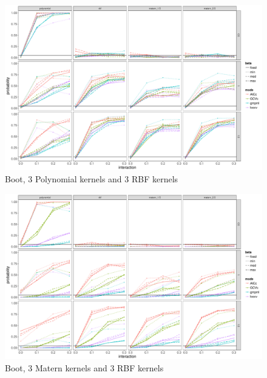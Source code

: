 \documentclass[article]{jss}
\begin{document}
\begin{appendix}
\begin{figure}
\begin{center}
\includegraphics[width=0.9\columnwidth]{exp_B4} 
\caption{Boot, 3 Polynomial kernels and 3 RBF kernels}
\label{fig:res}
\end{center}
\end{figure}

\begin{figure}
\begin{center}
\includegraphics[width=0.9\columnwidth]{exp_B5} 
\caption{Boot, 3 Matern kernels and 3 RBF kernels}
\label{fig:res}
\end{center}
\end{figure}


\end{appendix}

\end{document}
